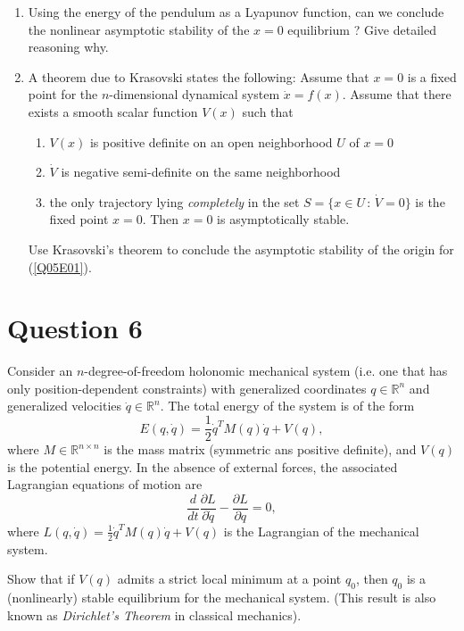 \documentclass[twoside,10pt,a4paper]{article}
\begin{document}
\begin{enumerate}[label=(\alph*)]
	\item Using the energy of the pendulum as a Lyapunov function, can we conclude the nonlinear asymptotic stability of the $x=0$ equilibrium ? Give detailed reasoning why.
	\item A theorem due to Krasovski states the following: Assume that $x=0$ is a fixed point for the $n$-dimensional dynamical system $\dot{x}=f(x)$. Assume that there exists a smooth scalar function $V(x)$ such that
	\begin{enumerate}[label=(\roman*)]
		\item $V(x)$ is positive definite on an open neighborhood $U$ of $x=0$
		\item $\dot{V}$ is negative semi-definite on the same neighborhood
		\item the only trajectory lying \textit{completely} in the set $S= \{ x\in U \, : \, \dot{V}=0 \}$ is the fixed point $x=0$. Then $x=0$ is asymptotically stable.
	\end{enumerate}
	Use Krasovski's theorem to conclude the asymptotic stability of the origin for (\ref{Q05E01}).
\end{enumerate}

\section*{Question 6}
Consider an $n$-degree-of-freedom holonomic mechanical system (i.e. one that has only position-dependent constraints) with generalized coordinates $q\in \mathbb{R}^n$ and generalized velocities $\dot{q}\in \mathbb{R}^n$. The total energy of the system is of the form
\begin{equation*}
	E(q, \dot{q}) = \frac{1}{2} \dot{q}^T M(q)\dot{q} + V(q),
\end{equation*}
where $M \in \mathbb{R}^{n \times n}$ is the mass matrix (symmetric ans positive definite), and $V(q)$ is the potential energy. In the absence of external forces, the associated Lagrangian equations of motion are
\begin{equation*}
	\frac{d}{dt} \frac{\partial L}{\partial \dot{q}} - \frac{\partial L}{\partial q} = 0,
\end{equation*}
where $L(q, \dot{q}) = \frac{1}{2}\dot{q}^T M(q)\dot{q} + V(q)$ is the Lagrangian of the mechanical system.

Show that if $V(q)$ admits a strict local minimum at a point $q_0$, then $q_0$ is a (nonlinearly) stable equilibrium for the mechanical system. (This result is also known as \textit{Dirichlet's Theorem} in classical mechanics).
\end{document}
